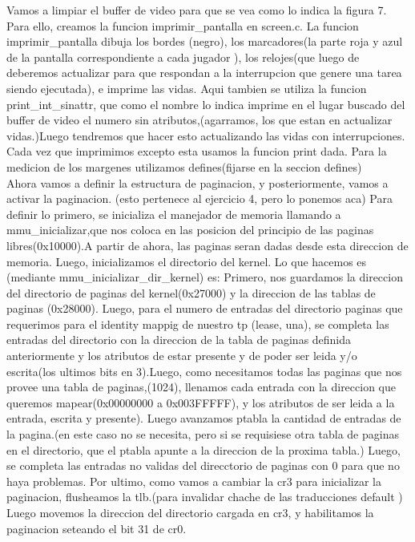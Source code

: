 \documentclass[a4paper]{article}
\begin{document}
Vamos a limpiar el buffer de video para que se vea como lo indica la figura 7. Para ello, creamos la funcion imprimir_pantalla en screen.c.
	La funcion imprimir_pantalla dibuja los bordes (negro), los marcadores(la parte roja y azul de la pantalla correspondiente a cada jugador ), los relojes(que luego de deberemos actualizar para que respondan a la interrupcion que genere una tarea siendo ejecutada), e imprime las vidas. Aqui tambien se utiliza la funcion print_int_sinattr, que como el nombre lo indica imprime en el lugar buscado del buffer de video el numero sin atributos,(agarramos, los que estan en actualizar vidas.)Luego tendremos que hacer esto actualizando las vidas con interrupciones. Cada vez que imprimimos excepto esta usamos la funcion print dada. Para la medicion de los margenes utilizamos defines(fijarse en la seccion defines)
	\\
	Ahora vamos a  definir la estructura de paginacion, y posteriormente, vamos a activar la paginacion.
(esto pertenece al ejercicio 4, pero lo ponemos aca)	Para definir lo primero, se inicializa el manejador de memoria llamando a mmu_inicializar,que nos coloca en las posicion del principio de las paginas libres(0x10000).A partir de ahora, las paginas seran dadas desde esta direccion de memoria. Luego, inicializamos el directorio del kernel. 
	Lo que hacemos es (mediante  mmu_inicializar_dir_kernel)  es:
	Primero, nos guardamos la direccion del directorio de paginas del kernel(0x27000) y la direccion de las tablas de paginas (0x28000).
	Luego, para el numero de entradas del directorio paginas que requerimos para el identity mappig de nuestro tp (lease, una), se completa las entradas del directorio con la direccion de la tabla de paginas definida anteriormente y los atributos de estar presente y de poder ser leida y/o escrita(los ultimos bits en 3).Luego, como necesitamos todas las paginas que nos provee una tabla de paginas,(1024), llenamos cada entrada con la direccion que queremos mapear(0x00000000 a 0x003FFFFF), y  los atributos de ser leida a la entrada, escrita y presente). Luego avanzamos ptabla la cantidad de entradas de la pagina.(en este caso no se necesita, pero si se requisiese otra tabla de paginas en el directorio, que el ptabla apunte a la direccion de la proxima tabla.) Luego, se completa las entradas no validas del direcctorio de paginas con 0 para que no haya problemas.
	Por ultimo, como vamos a cambiar la cr3 para inicializar la paginacion, flusheamos la tlb.(para invalidar chache de las traducciones default )
	Luego movemos la direccion del directorio cargada en cr3, y habilitamos la paginacion seteando el bit 31 de cr0.
\end{document}
